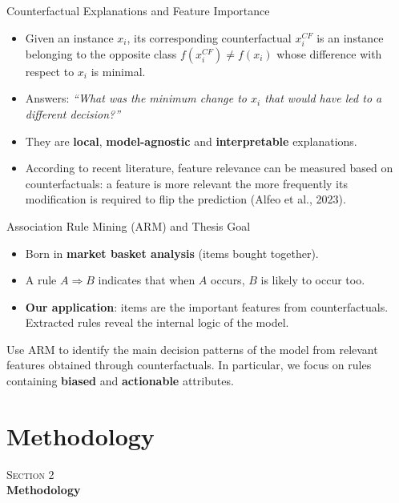 \documentclass[10pt,aspectratio=169]{beamer}
\begin{document}
\begin{frame}{Counterfactual Explanations and Feature Importance}
  \begin{itemize}
    \item Given an instance $x_i$, its corresponding counterfactual $x_i^{CF}$ is an instance belonging to the opposite class $f(x_i^{CF}) \neq f(x_i)$ whose difference with respect to $x_i$ is minimal.
    \item Answers: \emph{``What was the minimum change to $x_i$ that would have led to a different decision?''}
    \item They are \textbf{local}, \textbf{model-agnostic} and \textbf{interpretable} explanations.
    \item According to recent literature, feature relevance can be measured based on counterfactuals: a feature is more relevant the more frequently its modification is required to flip the prediction (Alfeo et al., 2023).
  \end{itemize}
\end{frame}

\begin{frame}{Association Rule Mining (ARM) and Thesis Goal}
  \begin{itemize}
    \item Born in \textbf{market basket analysis} (items bought together).
    \item A rule $A \Rightarrow B$ indicates that when $A$ occurs, $B$ is likely to occur too.
    \item \textbf{Our application}: items are the important features from counterfactuals. Extracted rules reveal the internal logic of the model.
  \end{itemize}
  \vspace{8pt}
  \begin{goalbox}
    Use ARM to identify the main decision patterns of the model from relevant features obtained through counterfactuals. In particular, we focus on rules containing \textbf{biased} and \textbf{actionable} attributes.
  \end{goalbox}
\end{frame}

\section{Methodology}

{
\begin{frame}[plain]
  \centering
  \vfill
  {\color{parthenopeblue}\large\textsc{Section 2}}\\[10pt]
  {\color{parthenopenavy}\Huge\bfseries Methodology}
  \vfill
\end{frame}}
\end{document}
